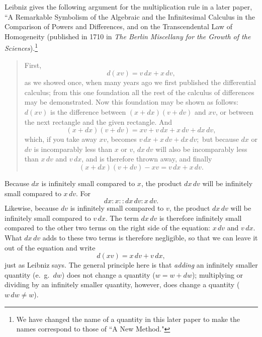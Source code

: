 \documentclass[polutonikogreek,english,twoside,openright]{article}
\begin{document}
 Leibniz gives the following argument for the multiplication rule in a
 later paper, ``A Remarkable Symbolism of the Algebraic and the
 Infinitesimal Calculus in the Comparison of Powers and Differences,
 and on the Transcendental Law of Homogeneity (published in 1710 in
 {\em The Berlin Miscellany for the Growth of the
   Sciences}).\footnote{We have changed the name of a quantity in
   this later paper to make the names correspond to those of ``A New
   Method."}
 \begin{quote}
First, 
$$d(xv) = v\,dx + x\,dv,$$
as we showed once, when many years ago we first published the
differential calculus; from this one foundation all the rest of the
calculus of differences may be demonstrated.  Now this foundation may
be shown as follows: $d(xv)$ is the difference between $(x+dx)(v+dv)$
and $xv$, or between the next rectangle and the given rectangle.  And
$$(x+dx)(v+dv) = xv + v\,dx + x\,dv + dx\,dv,$$
which, if you take away $xv$, becomes
$v\,dx + x\,dv + dx\,dv;$
but because $dx$ or $dv$ is incomparably less than $x$ or $v$, $dx\,dv$ will
also be incomparably less than $x\,dv$ and $v\,dx$, and is therefore thrown
away, and finally
$$(x+dx)(v+dv) - xv = v\,dx + x\,dv.$$
\end{quote}

 
Because $dx$ is infinitely small compared to $x$, the product $dx\,dv$
will be infinitely small compared to $x\,dv$. For
$$dx \!:\! x :: dx\,dv \!:\! x\,dv.$$
Likewise, because $dv$ is infinitely small compared to $v$, the
product $dx\,dv$ will be infinitely small compared to $v\,dx$.  The
term $dx\,dv$ is therefore infinitely small compared to the other two
terms on the right side of the equation: $x\,dv$ and $v\,dx.$ What
$dx\,dv$ adds to these two terms is therefore negligible, so that we
can leave it out of the equation and write
$$d(xv) = x\,dv + v\,dx,$$
just as Leibniz says.  The general principle here is that {\em adding}
an infinitely smaller quantity (e.\ g.\ $dw$) does not change a
quantity ($w = w+ dw$); multiplying or dividing by an infinitely
smaller quantity, however, does change a quantity ($w\,dw \neq w$).
\end{document}
